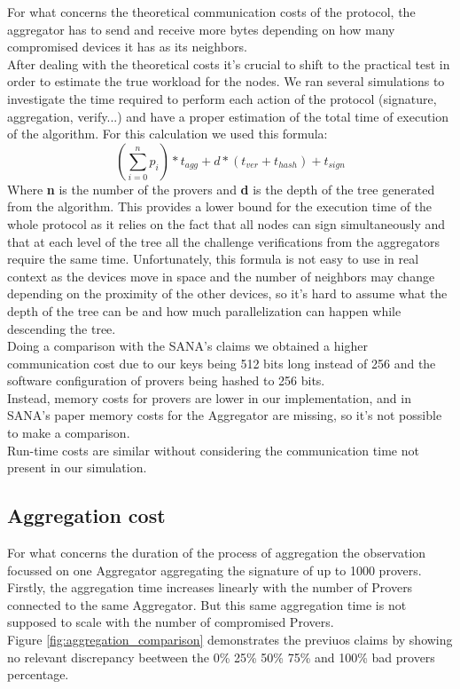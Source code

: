 For what concerns the theoretical communication costs of the protocol, 
the aggregator has to send and receive more bytes depending on how many compromised devices 
it has as its neighbors.\\

After dealing with the theoretical costs it's crucial to shift to the practical test in order to estimate the true workload for the nodes.
We ran several simulations to investigate the time required to perform each action of the protocol (signature, aggregation, verify...) and have a proper estimation of the total time of execution of the algorithm.
For this calculation we used this formula:
\[(\sum_{i=0}^{n} p_i) * t_{agg} + d * (t_{ver} + t_{hash}) + t_{sign} \]
Where \textbf{n} is the number of the provers and \textbf{d} is the depth of the tree generated from the algorithm.
This provides a lower bound for the execution time of the whole protocol as it relies on the fact that all nodes 
can sign simultaneously and that at each level of the tree all the challenge verifications from the aggregators require the same time.
Unfortunately, this formula is not easy to use in real context as the devices move in space and the number of neighbors may change depending on the proximity of the other devices, so it's hard to assume what the depth of the tree can be and how much parallelization can happen while descending the tree.\\

Doing a comparison with the SANA's claims we obtained a higher communication cost due to our keys being 512 bits long instead of 256 and the software configuration of provers being hashed to 256 bits.\\
Instead, memory costs for provers are lower in our implementation, and in SANA's paper memory costs for the Aggregator are missing, so it's not possible to make a comparison.\\
Run-time costs are similar without considering the communication time not present in our simulation.\\

\subsection{Aggregation cost}
For what concerns the duration of the process of aggregation the observation focussed on one Aggregator aggregating the signature of up to 1000 provers.
Firstly, the aggregation time increases linearly with the number of Provers connected to the same Aggregator.
But this same aggregation time is not supposed to scale with the number of compromised Provers.\\
Figure \ref{fig:aggregation_comparison} demonstrates the previuos claims by showing no relevant discrepancy beetween the 0\% 25\% 50\% 75\% and 100\% bad provers percentage.

